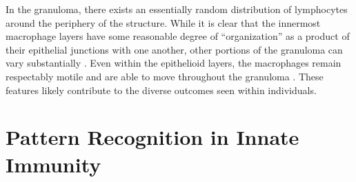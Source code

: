 In the granuloma, there exists an essentially random \citep{Orme2014a} distribution of lymphocytes around the periphery of the structure. While it is clear that the innermost macrophage layers have some reasonable degree of ``organization'' as a product of their epithelial junctions with one another, other portions of the granuloma can vary substantially \citep{Cronan2016}. Even within the epithelioid layers, the macrophages remain respectably motile and are able to move throughout the granuloma \citep{Cronan2018}. These features likely contribute to the diverse outcomes seen within individuals.

\section{Pattern Recognition in Innate Immunity}\label{clrs}

